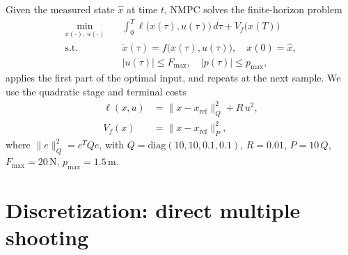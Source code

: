 \documentclass[11pt]{article}
\newcommand{\xref}{x_{\mathrm{ref}}}
\begin{document}
Given the measured state $\hat x$ at time $t$, NMPC solves the finite-horizon problem
\begin{equation}\label{eq:ocp-cont}
\begin{aligned}
  \min_{x(\cdot),\,u(\cdot)} \quad & \int_0^{T} \ell\big(x(\tau),u(\tau)\big)\,d\tau + V_f\big(x(T)\big)\\
  \text{s.t.}\quad & \dot x(\tau) = f\big(x(\tau),u(\tau)\big),\quad x(0)=\hat x,\\
                   & |u(\tau)| \le F_{\max},\quad |p(\tau)| \le p_{\max},
\end{aligned}
\end{equation}
applies the first part of the optimal input, and repeats at the next sample.
We use the quadratic stage and terminal costs
\begin{subequations}\label{eq:costs}
\begin{align}
  \ell(x,u) &= \|x-\xref\|_Q^2 + R\,u^2, \label{eq:stage-cost}\\
  V_f(x)    &= \|x-\xref\|_P^2,           \label{eq:terminal-cost}
\end{align}
\end{subequations}
where $\|e\|_Q^2 = e^TQe$, with $Q=\mathrm{diag}(10,10,0.1,0.1)$, $R=0.01$, $P=10\,Q$, $F_{\max}=20$\,N,
$p_{\max}=1.5$\,m.

\section{Discretization: direct multiple shooting}
\end{document}
